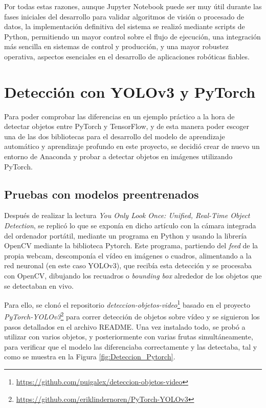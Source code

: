 Por todas estas razones, aunque Jupyter Notebook puede ser muy útil durante las fases iniciales del desarrollo para validar algoritmos de visión o procesado de datos, la implementación definitiva del sistema se realizó mediante scripts de Python, permitiendo un mayor control sobre el flujo de ejecución, una integración más sencilla en sistemas de control y producción, y una mayor robustez operativa, aspectos esenciales en el desarrollo de aplicaciones robóticas fiables.

\pagebreak
\section{Detección con YOLOv3 y PyTorch}
\label{exp_seleccion_algoritmo}

Para poder comprobar las diferencias en un ejemplo práctico a la hora de detectar objetos entre PyTorch y TensorFlow, y de esta manera poder escoger una de las dos bibliotecas para el desarrollo del modelo de aprendizaje automático y aprendizaje profundo en este proyecto, se decidió crear de nuevo un entorno de Anaconda y probar a detectar objetos en imágenes utilizando PyTorch.

\subsection{Pruebas con modelos preentrenados}
\label{sec:Pruebas_modelo_preentrenado_Pytorch}

Después de realizar la lectura \textit{You Only Look Once: Unified, Real-Time Object Detection}\cite{Redmon16}, se replicó lo que se exponía en dicho artículo con la cámara integrada del ordenador portátil, mediante un programa en Python y usando la librería OpenCV mediante la biblioteca Pytorch. Este programa, partiendo del \textit{feed} de la propia webcam, descomponía el vídeo en imágenes o cuadros, alimentando a la red neuronal (en este caso YOLOv3), que recibía esta detección y se procesaba con OpenCV, dibujando los recuadros o \textit{bounding box} alrededor de los objetos que se detectaban en vivo.

Para ello, se clonó el repositorio \textit{deteccion-objetos-video}\footnote{\url{https://github.com/puigalex/deteccion-objetos-video}} basado en el proyecto \textit{PyTorch-YOLOv3}\footnote{\url{https://github.com/eriklindernoren/PyTorch-YOLOv3}} para correr detección de objetos sobre vídeo y se siguieron los pasos detallados en el archivo README.
Una vez instalado todo, se probó a utilizar con varios objetos, y posteriormente con varias frutas simultáneamente, para verificar que el modelo las diferenciaba correctamente y las detectaba, tal y como se muestra en la Figura \ref{fig:Deteccion_Pytorch}.

